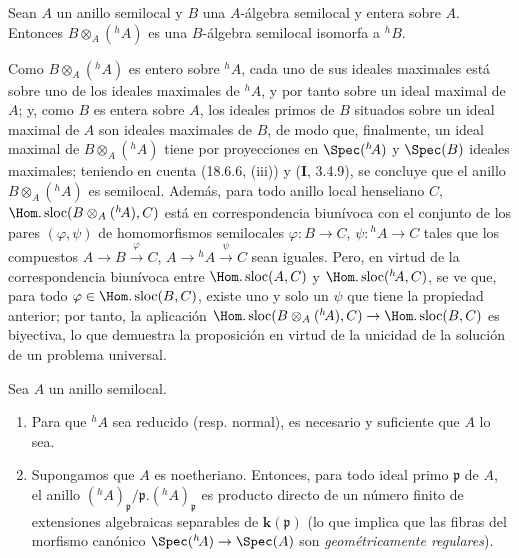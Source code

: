 \begin{proposition}[18.6.8]
\label{IV.18.6.8}
Sean $A$ un anillo semilocal y $B$ una $A$-álgebra semilocal y entera sobre $A$. Entonces $B\otimes_A({}^h\!A)$ es una $B$-álgebra semilocal isomorfa a ${}^h\!B$.
\end{proposition}

Como $B\otimes_A({}^h\!A)$ es entero sobre ${}^h\!A$, cada uno de sus ideales maximales está sobre uno de los ideales maximales de ${}^h\!A$, y por tanto sobre un ideal maximal de $A$; y, como $B$ es entera sobre $A$, los ideales primos de $B$ situados sobre un ideal maximal de $A$ son ideales maximales de $B$, de modo que, finalmente, un ideal maximal de $B\otimes_A({}^h\!A)$ tiene por proyecciones en $\Spec({}^h\!A)$ y $\Spec(B)$ ideales maximales; teniendo en cuenta (18.6.6, (iii)) y (\textbf I, 3.4.9), se concluye que el anillo $B\otimes_A({}^h\!A)$ es semilocal. Además, para todo anillo local henseliano $C$, $\Hom.\operatorname{sloc}(B\otimes_A({}^h\!A),C)$ está en correspondencia biunívoca con el conjunto de los pares $(\varphi,\psi)$ de homomorfismos semilocales $\varphi:B\to C$, $\psi:{}^h\!A\to C$ tales que los compuestos
$A\to B\xrightarrow{\varphi}C$, $A\to{}^h\!A\xrightarrow{\psi}C$
sean iguales. Pero, en virtud de la correspondencia biunívoca entre $\Hom.\operatorname{sloc}(A,C)$ y $\Hom.\operatorname{sloc}({}^h\!A,C)$, se ve que, para todo $\varphi\in\Hom.\operatorname{sloc}(B,C)$, existe uno y solo un $\psi$ que tiene la propiedad anterior; por tanto, la aplicación
$\Hom.\operatorname{sloc}(B\otimes_A({}^h\!A),C)\to\Hom.\operatorname{sloc}(B,C)$
es biyectiva, lo que demuestra la proposición en virtud de la unicidad de la solución de un problema universal.

\begin{theorem}[18.6.9]
\label{IV.18.6.9}
Sea $A$ un anillo semilocal.
\begin{enumerate}
  \item[\textup{(i)}] Para que ${}^h\!A$ sea reducido \textup{(resp.} normal\textup{)}, es necesario y suficiente que $A$ lo sea.
  \item[\textup{(ii)}] Supongamos que $A$ es noetheriano. Entonces, para todo ideal primo $\mathfrak p$ de $A$, el anillo $({}^h\!A)_{\mathfrak p}/\mathfrak p.({}^h\!A)_{\mathfrak p}$ es producto directo de un número finito de extensiones algebraicas separables de $\boldsymbol{k}(\mathfrak p)$ \textup{(lo que implica que las fibras del morfismo canónico $\Spec({}^h\!A)\to\Spec(A)$ son \emph{geométricamente regulares})}.
\end{enumerate}
\end{theorem}

